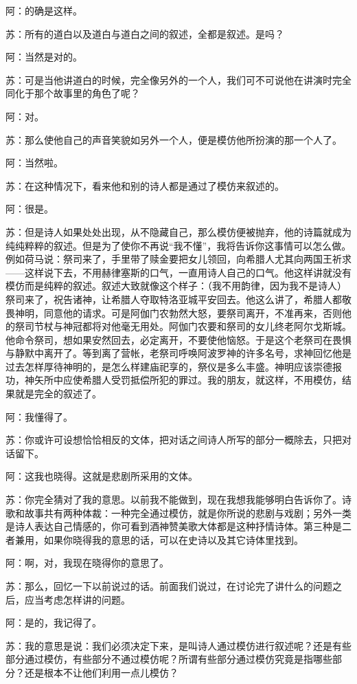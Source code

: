 \documentclass[11pt,oneside]{book}
\begin{document}
\begin{common-format}
阿：的确是这样。

苏：所有的道白以及道白与道白之间的叙述，全都是叙述。是吗？

阿：当然是对的。

苏：可是当他讲道白的时候，完全像另外的一个人，我们可不可说他在讲演时完全同化于那个故事里的角色了呢？

阿：对。

苏：那么使他自己的声音笑貌如另外一个人，便是模仿他所扮演的那一个人了。

阿：当然啦。

苏：在这种情况下，看来他和别的诗人都是通过了模仿来叙述的。

阿：很是。

苏：但是诗人如果处处出现，从不隐藏自己，那么模仿便被抛弃，他的诗篇就成为纯纯粹粹的叙述。但是为了使你不再说“我不懂”，我将告诉你这事情可以怎么做。例如荷马说：祭司来了，手里带了赎金要把女儿领回，向希腊人尤其向两国王祈求——这样说下去，不用赫律塞斯的口气，一直用诗人自己的口气。他这样讲就没有模仿而是纯粹的叙述。叙述大致就像这个样子：（我不用韵律，因为我不是诗人）祭司来了，祝告诸神，让希腊人夺取特洛亚城平安回去。他这么讲了，希腊人都敬畏神明，同意他的请求。可是阿伽门农勃然大怒，要祭司离开，不准再来，否则他的祭司节杖与神冠都将对他毫无用处。阿伽门农要和祭司的女儿终老阿尔戈斯城。他命令祭司，想如果安然回去，必定离开，不要使他恼怒。于是这个老祭司在畏惧与静默中离开了。等到离了营帐，老祭司呼唤阿波罗神的许多名号，求神回忆他是过去怎样厚待神明的，是怎么样建庙祀享的，祭仪是多么丰盛。神明应该崇德报功，神矢所中应使希腊人受罚抵偿所犯的罪过。我的朋友，就这样，不用模仿，结果就是完全的叙述了。

阿：我懂得了。

苏：你或许可设想恰恰相反的文体，把对话之间诗人所写的部分一概除去，只把对话留下。

阿：这我也晓得。这就是悲剧所采用的文体。

苏：你完全猜对了我的意思。以前我不能做到，现在我想我能够明白告诉你了。诗歌和故事共有两种体裁：一种完全通过模仿，就是你所说的悲剧与戏剧；另外一类是诗人表达自己情感的，你可看到酒神赞美歌大体都是这种抒情诗体。第三种是二者兼用，如果你晓得我的意思的话，可以在史诗以及其它诗体里找到。

阿：啊，对，我现在晓得你的意思了。

苏：那么，回忆一下以前说过的话。前面我们说过，在讨论完了讲什么的问题之后，应当考虑怎样讲的问题。

阿：是的，我记得了。

苏：我的意思是说：我们必须决定下来，是叫诗人通过模仿进行叙述呢？还是有些部分通过模仿，有些部分不通过模仿呢？所谓有些部分通过模仿究竟是指哪些部分？还是根本不让他们利用一点儿模仿？


\end{common-format}
\end{document}

